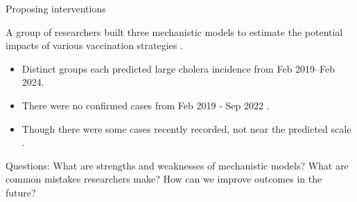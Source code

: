 \documentclass[aspectratio=169]{beamer}\usepackage[]{graphicx}\usepackage[]{xcolor}
\begin{document}

\begin{frame}{Proposing interventions}

A group of researchers built three mechanistic models to estimate the potential impacts of various vaccination strategies \citep{lee20}.

\begin{itemize}
  \item Distinct groups each predicted large cholera incidence from Feb 2019--Feb 2024. 
  \item There were no confirmed cases from Feb 2019 - Sep 2022 \citep{trevisin22}. 
  \item Though there were some cases recently recorded, not near the predicted scale \citep{PAHO23}.
\end{itemize}\pause

\alert{Questions:} What are strengths and weaknesses of mechanistic models? What are common mistakes researchers make? How can we improve outcomes in the future?

\end{frame}
\end{document}
